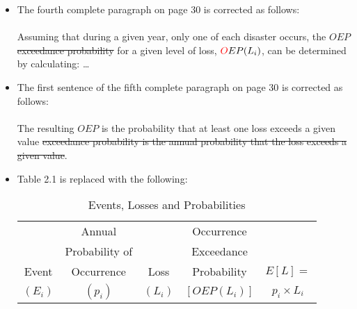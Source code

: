 \documentclass[]{article}
\begin{document}
\begin{itemize}
\item The fourth complete paragraph on page 30 is corrected as follows:\\
\\
Assuming that during a given year, only one \color{red} of each \color{black} disaster occurs, the \color{red} $OEP$  \sout{exceedance probability} \color{black} for a given level of loss, $\color{red}O \color{black}EP(L_i)$, can be determined by calculating: \ldots
\item The first sentence of the fifth complete paragraph on page 30 is corrected as follows:\\
\\
The resulting \color{red} $OEP$ is the probability that at least one loss exceeds a given value  \sout{exceedance probability is the annual probability that the loss exceeds a given value}\color{black}.
\newpage
\item Table 2.1 is replaced with the following:
\begin{table}[h]
  \centering
  \caption{Events, Losses and Probabilities}
    \begin{tabular}{crrrr}
    \toprule
    
 & \multicolumn{1}{c}{Annual} & & \multicolumn{1}{c}{Occurrence}
 &   \\

 & \multicolumn{1}{c}{Probability of } & 
 & \multicolumn{1}{c}{Exceedance} &  \\

Event & \multicolumn{1}{c}{Occurrence} & \multicolumn{1}{c}{Loss}
 & \multicolumn{1}{c}{Probability} & \multicolumn{1}{c}{$E[L] =$ } \\

\multicolumn{1}{c}{$(E_i)$} & \multicolumn{1}{c}{$(p_i)$} & \multicolumn{1}{c}{$(L_i)$}
 & \multicolumn{1}{c}{$[OEP(L_i)]$} & \multicolumn{1}{c}{$p_i \times L_i$ } \\



\end{tabular}
\end{table}
\end{itemize}
\end{document}
